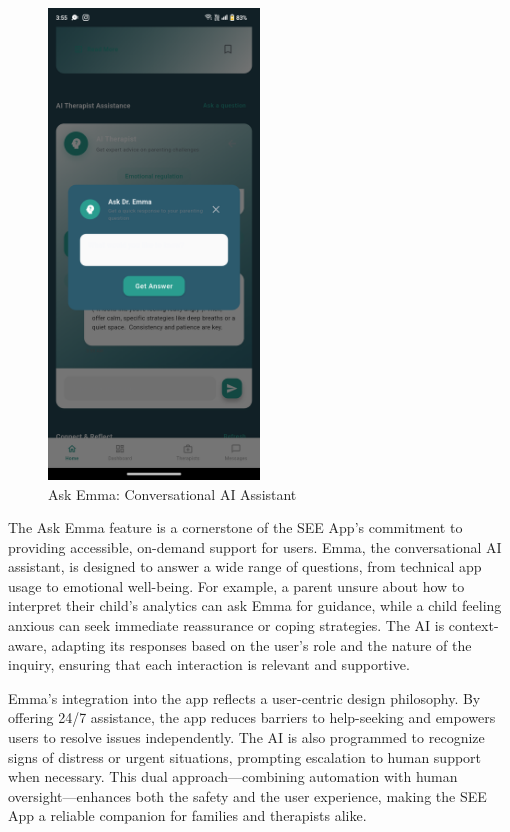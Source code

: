 \documentclass[12pt,a4paper]{article}
\begin{document}
\begin{figure}[H]
    \centering
    \includegraphics[width=0.5\textwidth]{Screenshots/askemma.png}
    \caption{Ask Emma: Conversational AI Assistant}
    \label{fig:ask-emma}
\end{figure}
The Ask Emma feature is a cornerstone of the SEE App's commitment to providing accessible, on-demand support for users. Emma, the conversational AI assistant, is designed to answer a wide range of questions, from technical app usage to emotional well-being. For example, a parent unsure about how to interpret their child's analytics can ask Emma for guidance, while a child feeling anxious can seek immediate reassurance or coping strategies. The AI is context-aware, adapting its responses based on the user's role and the nature of the inquiry, ensuring that each interaction is relevant and supportive.

Emma's integration into the app reflects a user-centric design philosophy. By offering 24/7 assistance, the app reduces barriers to help-seeking and empowers users to resolve issues independently. The AI is also programmed to recognize signs of distress or urgent situations, prompting escalation to human support when necessary. This dual approach—combining automation with human oversight—enhances both the safety and the user experience, making the SEE App a reliable companion for families and therapists alike.
\end{document}
